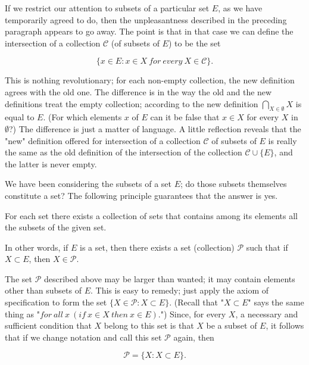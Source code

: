 If we restrict our attention to subsets of a particular set $E$, as we have temporarily agreed to do, then the unpleasantness described in the preceding paragraph appears to go away. The point is that in that case we can define the intersection of a collection $ \mathcal{C} $ (of subsets of $E$) to be the set 

\begin{equation*}
\{ x \in E: x \in X \: for \: every \: X \in \mathcal{C} \}.
\end{equation*}

This is nothing revolutionary; for each non-empty collection, the new definition agrees with the old one. The difference is in the way the old and the new definitions treat the empty collection; according to the new definition  $\bigcap_{X \in \emptyset} X$ is equal to $E$. (For which elements $x$ of $E$ can it be false that $x \in X$ for every $X$ in $\emptyset $?) The difference is just a matter of language. A little reflection reveals that the "new" definition offered for intersection of a collection $ \mathcal{C} $ of subsets of $E$ is really the same as the old definition of the intersection of the collection $ \mathcal{C} \cup \{ E \} $, and the latter is never empty. 

We have been considering the subsets of a set $E$; do those subsets themselves constitute a set? The following principle guarantees that the answer is yes.

\begin{named}  For each set there exists a collection of sets that contains among its elements all the subsets of the given set. 
\end{named}

In other words, if $E$ is a set, then there exists a set (collection) $ \mathcal{P} $ such that if $X \subset E$, then $X \in \mathcal{P}$.
 
The set $ \mathcal{P} $ described above may be larger than wanted; it may contain elements other than subsets of $E$. This is easy to remedy; just apply the axiom of specification to form the set $ \{ X \in \mathcal{P}: X \subset E \} $. (Recall that "$ X \subset E $"  says the same thing as "$for \: all \: x \:(if \: x \in X \: then \: x \in E) $.") Since, for every $X$, a necessary and sufficient condition that $X$ belong to this set is that $X$ be a subset of $E$, it follows that if we change notation and call this set $ \mathcal{P} $ again, then 

\begin{equation*}
\mathcal{P} = \{ X : X \subset E \} .
\end{equation*}

